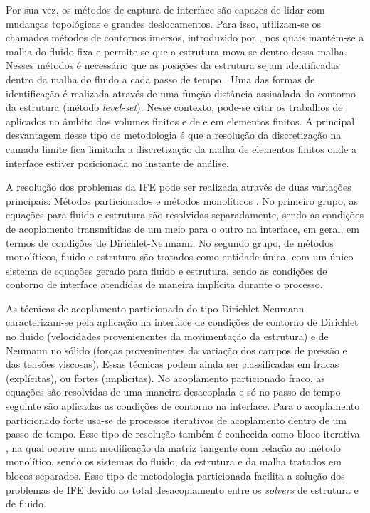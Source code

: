 \documentclass[tese_patricia.tex]{subfiles}
\begin{document}
Por sua vez, os métodos de captura de interface são capazes de lidar com mudanças topológicas e grandes deslocamentos. Para isso, utilizam-se os chamados métodos de contornos imersos, introduzido por , nos quais mantém-se a malha do fluido fixa e permite-se que a estrutura mova-se dentro dessa malha. Nesses métodos é necessário que as posições da estrutura sejam identificadas dentro da malha do fluido a cada passo de tempo \cite{MittalI:2005,WangRGF:2011}. Uma das formas de identificação é realizada através de uma função distância assinalada do contorno da estrutura (método \textit{level-set}). Nesse contexto, pode-se citar os trabalhos de   aplicados no âmbito dos volumes finitos e de  e  em elementos finitos. A principal desvantagem desse tipo de metodologia é que a resolução da discretização na camada limite fica limitada a discretização da malha de elementos finitos onde a interface estiver posicionada no instante de análise.


A resolução dos problemas da IFE pode ser realizada através de duas variações principais: Métodos particionados \cite{RouxG:2009,BazilevsHKWB:2011, SanchesC:2013,SanchesC:2014,FernandesCS:2019} e métodos monolíticos \cite{Blom:1998,Hubneretal:2004,HronM:2007,Avancini:2023}. No primeiro grupo, as equações para fluido e estrutura são resolvidas separadamente, sendo as condições de acoplamento transmitidas de um meio para o outro na interface, em geral, em termos de condições de Dirichlet-Neumann. No segundo grupo, de métodos monolíticos, fluido e estrutura são tratados como entidade única, com um único sistema de equações gerado para fluido e estrutura, sendo as condições de contorno de interface atendidas de maneira implícita durante o processo.


As técnicas de acoplamento particionado do tipo Dirichlet-Neumann caracterizam-se pela aplicação na interface de condições de contorno de Dirichlet no fluido (velocidades provenienentes da movimentação da estrutura) e de Neumann no sólido (forças proveninentes da variação dos campos de pressão e das tensões viscosas). Essas técnicas podem ainda ser classificadas em fracas (explícitas), ou fortes (implícitas). No acoplamento particionado fraco, as equações são resolvidas de uma maneira desacoplada e só no passo de tempo seguinte são aplicadas as condições de contorno na interface. Para o acoplamento particionado forte usa-se de processos iterativos de acoplamento dentro de um passo de tempo. Esse tipo de resolução também é conhecida como bloco-iterativa \cite{BazilevsTT:2013}, na qual ocorre uma modificação da matriz tangente com relação ao método monolítico, sendo os sistemas do fluido, da estrutura e da malha tratados em blocos separados. Esse tipo de metodologia particionada facilita a solução dos problemas de IFE devido ao total desacoplamento entre os \textit{solvers} de estrutura e de fluido.
\end{document}
